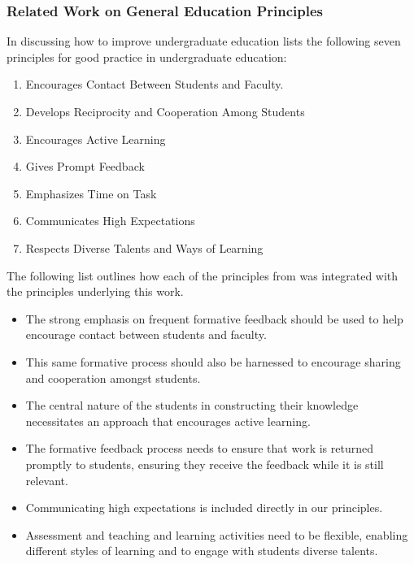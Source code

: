 

\subsubsection{Related Work on General Education Principles} %
\label{ssub:related_work_on_education_principles}

In discussing how to improve undergraduate education \citet{Chickering:1987} lists the following seven principles for good practice in undergraduate education:
\begin{enumerate}
	\item Encourages Contact Between Students and Faculty.
	\item Develops Reciprocity and Cooperation Among Students
	\item Encourages Active Learning
	\item Gives Prompt Feedback
	\item Emphasizes Time on Task
	\item Communicates High Expectations
	\item Respects Diverse Talents and Ways of Learning
\end{enumerate}


The following list outlines how each of the principles from \citet{Chickering:1987} was integrated with the principles underlying this work. 

\begin{itemize}
	\item The strong emphasis on frequent formative feedback should be used to help encourage contact between students and faculty.
	\item This same formative process should also be harnessed to encourage sharing and cooperation amongst students.
	\item The central nature of the students in constructing their knowledge necessitates an approach that encourages active learning.
	\item The formative feedback process needs to ensure that work is returned promptly to students, ensuring they receive the feedback while it is still relevant.
	\item Communicating high expectations is included directly in our principles.
	\item Assessment and teaching and learning activities need to be flexible, enabling different styles of learning and to engage with students diverse talents.
\end{itemize}

